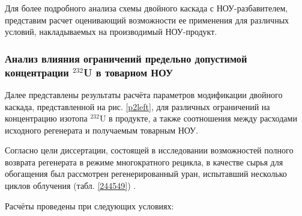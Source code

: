 Для более подробного анализа схемы двойного каскада с НОУ-разбавителем, представим расчет оценивающий возможности ее применения для различных условий, накладываемых на производимый НОУ-продукт.

\subsubsection{Анализ влияния ограничений предельно допустимой концентрации $^{232}$U в товарном НОУ}

Далее представлены результаты расчёта параметров модификации двойного каскада, представленной на рис. \ref{p2left}, для различных ограничений на концентрацию изотопа $^{232}$U в продукте, а также соотношения между расходами исходного регенерата и получаемым товарным НОУ.

Согласно цели диссертации, состоящей в исследовании возможностей полного возврата регенерата в режиме многократного рецикла, в качестве сырья для обогащения был рассмотрен регенерированный уран, испытавший несколько циклов облучения (табл. \ref{244549}) \cite{palkinDesignanalyticalResearchRefinement2010}.

Расчёты проведены при следующих условиях:

